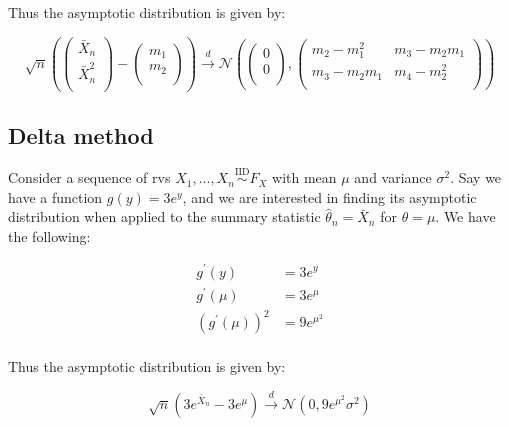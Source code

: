 \documentclass{report}
\begin{document}
Thus the asymptotic distribution is given by:

\begin{equation}\label{eq:ex-lst-clt-proof-5}
    \sqrt{n} \left(\begin{pmatrix}
        \bar{X}_n \\
        \bar{X}_n^2 \\
    \end{pmatrix} - \begin{pmatrix}
        m_1 \\
        m_2 \\
    \end{pmatrix}\right) \overset{d}{\to} \mathcal{N}\left(\begin{pmatrix}
        0 \\
        0 \\
    \end{pmatrix}, \begin{pmatrix}
        m_2 - m_1^2 & m_3 - m_2m_1 \\
        m_3 - m_2m_1 & m_4 - m_2^2 \\
    \end{pmatrix}\right)
\end{equation}

\subsection{Delta method}

Consider a sequence of \glspl{rv} $X_1, \dots, X_n \overset{\text{IID}}{\sim} F_X$ with mean $\mu$ and variance $\sigma^2$. Say we have a function $g(y) = 3e^y$, and we are interested in finding its asymptotic distribution when applied to the summary statistic $\hat{\theta}_n= \bar{X}_n$ for $\theta = \mu$. We have the following:

\begin{equation}\label{eq:ex-lst-delta-method-exp-1}
    \begin{aligned}
        g^\prime(y) &= 3e^y \\
        g^\prime(\mu) &= 3e^\mu \\
        \left(g^\prime(\mu)\right)^2 &= 9e^{\mu^2} \\
    \end{aligned}
\end{equation}

Thus the asymptotic distribution is given by:

\begin{equation}\label{eq:ex-lst-delta-method-exp-2}
    \sqrt{n}\left(3e^{\bar{X}_n} - 3e^\mu\right) \overset{d}{\to} \mathcal{N}\left(0, 9e^{\mu^2}\sigma^2\right)
\end{equation}
\end{document}
